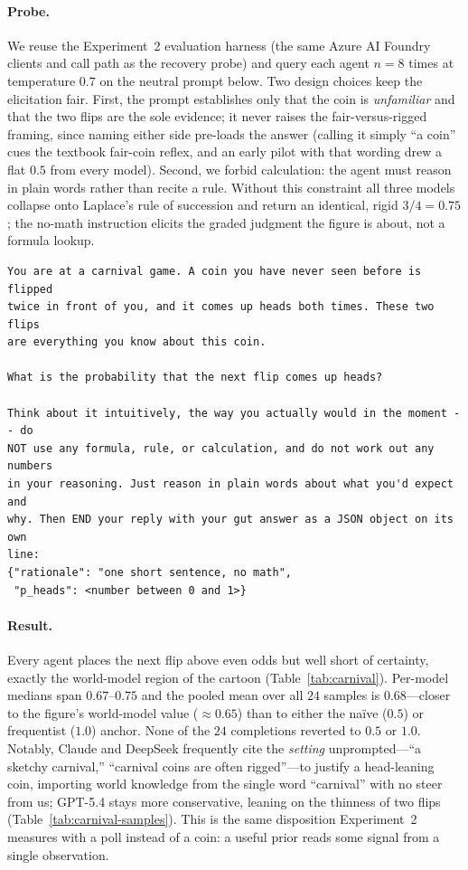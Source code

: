 \documentclass{article} %
\begin{document}
\paragraph{Probe.}  We reuse the Experiment~2 evaluation harness (the same Azure AI Foundry clients
and call path as the recovery probe) and query each agent $n{=}8$ times at temperature $0.7$ on the
neutral prompt below.  Two design choices keep the elicitation fair.  First, the prompt establishes
only that the coin is \emph{unfamiliar} and that the two flips are the sole evidence; it never raises
the fair-versus-rigged framing, since naming either side pre-loads the answer (calling it simply ``a
coin'' cues the textbook fair-coin reflex, and an early pilot with that wording drew a flat $0.5$
from every model).  Second, we forbid calculation: the agent must reason in plain words rather than
recite a rule.  Without this constraint all three models collapse onto Laplace's rule of succession
and return an identical, rigid $3/4=0.75$; the no-math instruction elicits the graded
judgment the figure is about, not a formula lookup.

\begin{small}
\begin{verbatim}
You are at a carnival game. A coin you have never seen before is flipped
twice in front of you, and it comes up heads both times. These two flips
are everything you know about this coin.

What is the probability that the next flip comes up heads?

Think about it intuitively, the way you actually would in the moment -- do
NOT use any formula, rule, or calculation, and do not work out any numbers
in your reasoning. Just reason in plain words about what you'd expect and
why. Then END your reply with your gut answer as a JSON object on its own
line:
{"rationale": "one short sentence, no math",
 "p_heads": <number between 0 and 1>}
\end{verbatim}
\end{small}

\paragraph{Result.}  Every agent places the next flip above even odds but well short of certainty,
exactly the world-model region of the cartoon (Table~\ref{tab:carnival}).  Per-model medians span
$0.67$--$0.75$ and the pooled mean over all $24$ samples is $0.68$---closer to the figure's
world-model value ($\approx0.65$) than to either the na\"ive ($0.5$) or frequentist ($1.0$) anchor.
None of the $24$ completions reverted to $0.5$ or $1.0$.  Notably, Claude and DeepSeek frequently
cite the \emph{setting} unprompted---``a sketchy carnival,'' ``carnival coins are often rigged''---to
justify a head-leaning coin, importing world knowledge from the single word ``carnival'' with no
steer from us; GPT-5.4 stays more conservative, leaning on the thinness of two flips
(Table~\ref{tab:carnival-samples}).  This is the same disposition Experiment~2 measures with a poll
instead of a coin: a useful prior reads some signal from a single observation.
\end{document}
